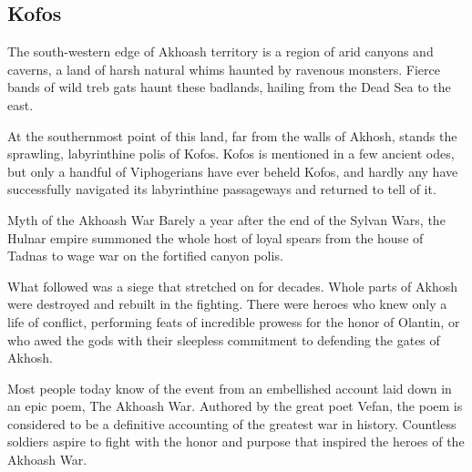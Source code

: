 \thispagestyle{empty} %

\subsection*{Kofos}
    The south-western edge of Akhoash territory is a region of arid canyons and caverns, a land of harsh natural whims haunted by ravenous monsters.
    Fierce bands of wild treb gats haunt these badlands, hailing from the Dead Sea to the east.

    At the southernmost point of this land, far from the walls of Akhosh, stands the sprawling, labyrinthine polis of Kofos.
    Kofos is mentioned in a few ancient odes, but only a handful of Viphogerians have ever beheld Kofos, and hardly any have successfully navigated its labyrinthine passageways and returned to tell of it.

    \newpage

    \begin{DndComment}[float=t]{Myth of the Akhoash War}
        Barely a year after the end of the Sylvan Wars, the Hulnar empire summoned the whole host of loyal spears from the house of Tadnas to wage war on the fortified canyon polis.

        What followed was a siege that stretched on for decades.
        Whole parts of Akhosh were destroyed and rebuilt in the fighting.
        There were heroes who knew only a life of conflict, performing feats of incredible prowess for the honor of Olantin, or who awed the gods with their sleepless commitment to defending the gates of Akhosh.

        Most people today know of the event from an embellished account laid down in an epic poem, The Akhoash War.
        Authored by the great poet Vefan, the poem is considered to be a definitive accounting of the greatest war in history.
        Countless soldiers aspire to fight with the honor and purpose that inspired the heroes of the Akhoash War.
    \end{DndComment}

